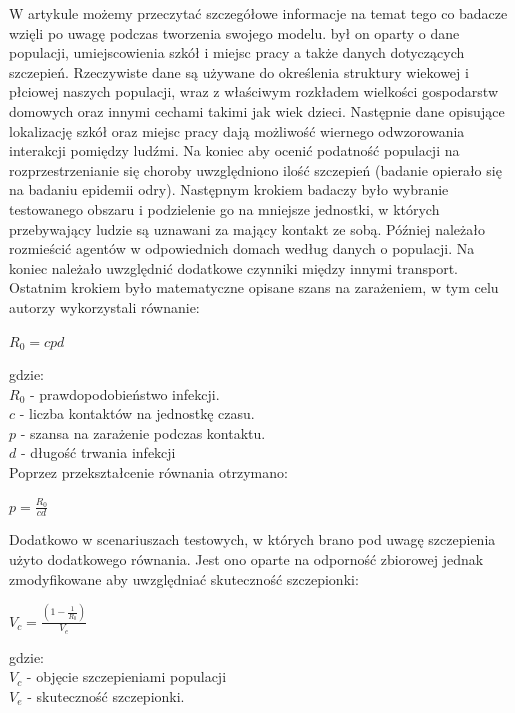 W artykule możemy przeczytać szczegółowe informacje na temat tego co badacze wzięli po uwagę podczas tworzenia swojego modelu.
był on oparty o dane populacji, umiejscowienia szkół i miejsc pracy a także danych dotyczących szczepień. Rzeczywiste dane są używane do określenia struktury wiekowej i płciowej naszych populacji, wraz z właściwym rozkładem wielkości gospodarstw domowych oraz innymi cechami takimi jak wiek dzieci. Następnie dane opisujące lokalizację szkół oraz miejsc pracy dają możliwość wiernego odwzorowania interakcji pomiędzy ludźmi. Na koniec aby ocenić podatność populacji na rozprzestrzenianie się choroby uwzględniono ilość szczepień (badanie opierało się na badaniu epidemii odry).
Następnym krokiem badaczy było wybranie testowanego obszaru i podzielenie go na mniejsze jednostki, w których przebywający ludzie są uznawani za mający kontakt ze sobą. Później należało rozmieścić agentów w odpowiednich domach według danych o populacji. Na koniec należało uwzględnić dodatkowe czynniki między innymi transport. 
Ostatnim krokiem było matematyczne opisane szans na zarażeniem, w tym celu autorzy wykorzystali równanie:

\begin{center}
$R_0 = cpd$
\end{center}

gdzie:\\
$R_0$ - prawdopodobieństwo infekcji. \\
$c$ - liczba kontaktów na jednostkę czasu. \\
$p$ - szansa na zarażenie podczas kontaktu. \\
$d$ - długość trwania infekcji \\

Poprzez przekształcenie równania otrzymano: 
\begin{center}
$ p = \frac{R_0}{cd} $
\end{center}

Dodatkowo w scenariuszach testowych, w których brano pod uwagę szczepienia użyto dodatkowego równania. Jest ono oparte na odporność zbiorowej jednak zmodyfikowane aby uwzględniać skuteczność szczepionki:

\begin{center}
	$V_c = \frac{(1-\frac{1}{R_0})}{V_e}$
\end{center}

gdzie:\\
$V_c$ - objęcie szczepieniami populacji \\
$V_e$ - skuteczność szczepionki. \\

